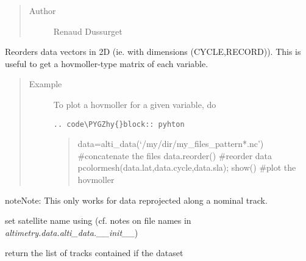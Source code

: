 \documentclass[letterpaper,10pt,english]{sphinxmanual}
\def\PYGZhy{\char`\-}
\begin{document}
\begin{fulllineitems}
\begin{fulllineitems}
\begin{quote}
\begin{description}
\item[{Author}] \leavevmode
Renaud Dussurget

\end{description}\end{quote}

\end{fulllineitems}


\begin{fulllineitems}
\label{altimetry.data:altimetry.data.alti_data.reorder}
Reorders data vectors in 2D (ie. with dimensions (CYCLE,RECORD)). This is useful to get a hovmoller-type matrix of each variable.
\begin{quote}\begin{description}
\item[{Example}] \leavevmode
To plot a hovmoller for a given variable, do

\begin{Verbatim}[commandchars=\\\{\}]
.. code\PYGZhy{}block:: pyhton
\end{Verbatim}
\begin{quote}

data=alti\_data(`/my/dir/my\_files\_pattern*.nc') \#concatenate the files
data.reorder() \#reorder data
pcolormesh(data.lat,data.cycle,data.sla); show() \#plot the hovmoller
\end{quote}

\end{description}\end{quote}

\begin{notice}{note}{Note:}
This only works for data reprojected along a nominal track.
\end{notice}

\end{fulllineitems}


\begin{fulllineitems}
\label{altimetry.data:altimetry.data.alti_data.set_sats}
set satellite name using (cf. notes on file names in \emph{altimetry.data.alti\_data.\_\_init\_\_})

\end{fulllineitems}


\begin{fulllineitems}
\label{altimetry.data:altimetry.data.alti_data.track_list}
return the list of tracks contained if the dataset

\end{fulllineitems}


\end{fulllineitems}
\end{document}
